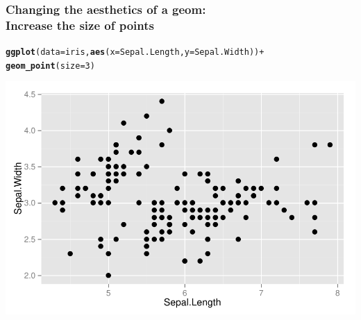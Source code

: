 \documentclass{beamer}\usepackage[]{graphicx}\usepackage[]{color}
\makeatletter
\newcommand{\hlnum}[1]{\textcolor[rgb]{0.686,0.059,0.569}{#1}}%
\newcommand{\hlopt}[1]{\textcolor[rgb]{0,0,0}{#1}}%
\newcommand{\hlstd}[1]{\textcolor[rgb]{0.345,0.345,0.345}{#1}}%
\newcommand{\hlkwc}[1]{\textcolor[rgb]{0.333,0.667,0.333}{#1}}%
\newcommand{\hlkwd}[1]{\textcolor[rgb]{0.737,0.353,0.396}{\textbf{#1}}}%
\newenvironment{kframe}{%
 \def\at@end@of@kframe{}%
 \ifinner\ifhmode%
  \def\at@end@of@kframe{\end{minipage}}%
  \begin{minipage}{\columnwidth}%
 \fi\fi%
 \def\FrameCommand##1{\hskip\@totalleftmargin \hskip-\fboxsep
 \colorbox{shadecolor}{##1}\hskip-\fboxsep
     \hskip-\linewidth \hskip-\@totalleftmargin \hskip\columnwidth}%
 \MakeFramed {\advance\hsize-\width
   \@totalleftmargin\z@ \linewidth\hsize
   \@setminipage}}%
 {\par\unskip\endMakeFramed%
 \at@end@of@kframe}
\newenvironment{knitrout}{}{} %
\makeatother
\begin{document}
\begin{frame}[fragile]
\frametitle{Changing the aesthetics of a geom: \\Increase the size of points}
\begin{knitrout}\footnotesize
{}\color{fgcolor}\begin{kframe}
\begin{alltt}
\hlkwd{ggplot}\hlstd{(}\hlkwc{data} \hlstd{= iris,} \hlkwd{aes}\hlstd{(}\hlkwc{x} \hlstd{= Sepal.Length,} \hlkwc{y} \hlstd{= Sepal.Width))} \hlopt{+}
\hlkwd{geom_point}\hlstd{(}\hlkwc{size} \hlstd{=} \hlnum{3}\hlstd{)}
\end{alltt}
\end{kframe}

{\centering \includegraphics[width=.75\linewidth]{figure/first_plot_size_} 

}



\end{knitrout}

\end{frame}

\end{document}
